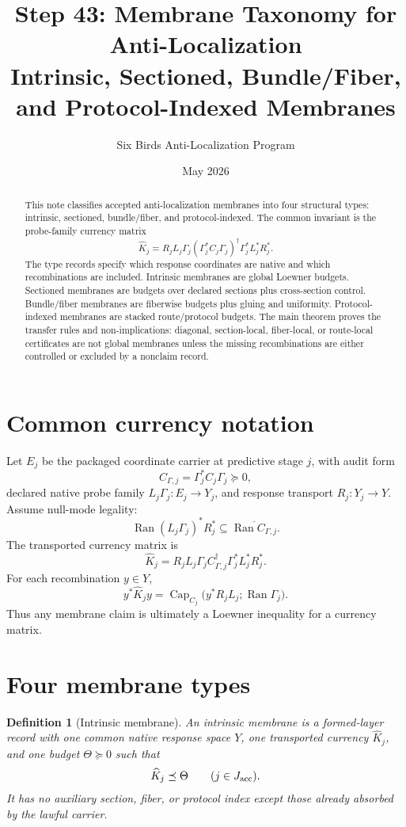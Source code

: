 \documentclass[11pt]{article}
\title{Step 43: Membrane Taxonomy for Anti-Localization\\
\large Intrinsic, Sectioned, Bundle/Fiber, and Protocol-Indexed Membranes}
\author{Six Birds Anti-Localization Program}
\date{May 2026}
\newtheorem{definition}[theorem]{Definition}
\newcommand{\Ran}{\operatorname{Ran}}
\newcommand{\Capacity}{\operatorname{Cap}}
\begin{document}
\maketitle

\begin{abstract}
This note classifies accepted anti-localization membranes into four structural types: intrinsic, sectioned, bundle/fiber, and protocol-indexed. The common invariant is the probe-family currency matrix
\[
  \widehat K_j=R_jL_j\Gamma_j(\Gamma_j^*C_j\Gamma_j)^\dagger\Gamma_j^*L_j^*R_j^*.
\]
The type records specify which response coordinates are native and which recombinations are included. Intrinsic membranes are global Loewner budgets. Sectioned membranes are budgets over declared sections plus cross-section control. Bundle/fiber membranes are fiberwise budgets plus gluing and uniformity. Protocol-indexed membranes are stacked route/protocol budgets. The main theorem proves the transfer rules and non-implications: diagonal, section-local, fiber-local, or route-local certificates are not global membranes unless the missing recombinations are either controlled or excluded by a nonclaim record.
\end{abstract}

\section{Common currency notation}
Let \(E_j\) be the packaged coordinate carrier at predictive stage \(j\), with audit form
\[
  C_{\Gamma,j}=\Gamma_j^*C_j\Gamma_j\succeq0,
\]
declared native probe family \(L_j\Gamma_j:E_j\to Y_j\), and response transport \(R_j:Y_j\to Y\). Assume null-mode legality:
\[
  \Ran (L_j\Gamma_j)^*R_j^*\subseteq\overline{\Ran C_{\Gamma,j}}.
\]
The transported currency matrix is
\begin{equation}\label{eq:khat}
  \widehat K_j=R_jL_j\Gamma_jC_{\Gamma,j}^{\dagger}\Gamma_j^*L_j^*R_j^*.
\end{equation}
For each recombination \(y\in Y\),
\[
  y^*\widehat K_jy
  =\Capacity_{C_j}\bigl(y^*R_jL_j;\Ran\Gamma_j\bigr).
\]
Thus any membrane claim is ultimately a Loewner inequality for a currency matrix.

\section{Four membrane types}

\begin{definition}[Intrinsic membrane]
An \emph{intrinsic membrane} is a formed-layer record with one common native response space \(Y\), one transported currency \(\widehat K_j\), and one budget \(\Theta\succeq0\) such that
\begin{equation}\label{eq:intrinsic}
  \widehat K_j\preceq\Theta\qquad(j\in J_{\rm acc}).
\end{equation}
It has no auxiliary section, fiber, or protocol index except those already absorbed by the lawful carrier.
\end{definition}
\end{document}
